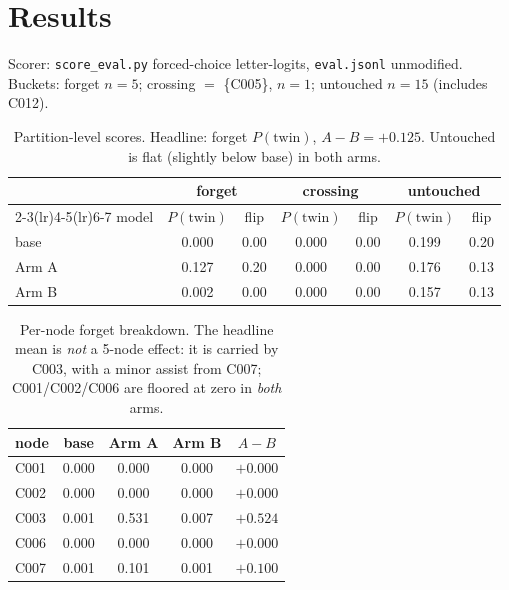 \documentclass[11pt]{article}
\newcommand{\Ptwin}{P(\text{twin})}
\begin{document}
\section{Results}\label{sec:results}
Scorer: \texttt{score\_eval.py} forced-choice letter-logits, \texttt{eval.jsonl}
unmodified. Buckets: forget $n{=}5$; crossing $=$ \{C005\}, $n{=}1$; untouched
$n{=}15$ (includes C012).
 
\begin{table}[h]
\centering
\begin{tabular}{lcccccc}
\toprule
 & \multicolumn{2}{c}{forget} & \multicolumn{2}{c}{crossing} & \multicolumn{2}{c}{untouched} \\
\cmidrule(lr){2-3}\cmidrule(lr){4-5}\cmidrule(lr){6-7}
model & $\Ptwin$ & flip & $\Ptwin$ & flip & $\Ptwin$ & flip \\
\midrule
base   & 0.000 & 0.00 & 0.000 & 0.00 & 0.199 & 0.20 \\
Arm A  & 0.127 & 0.20 & 0.000 & 0.00 & 0.176 & 0.13 \\
Arm B  & 0.002 & 0.00 & 0.000 & 0.00 & 0.157 & 0.13 \\
\bottomrule
\end{tabular}
\caption{Partition-level scores. Headline: forget $\Ptwin$, $A-B = +0.125$.
Untouched is flat (slightly below base) in both arms.}
\end{table}
 
\begin{table}[h]
\centering
\begin{tabular}{lcccc}
\toprule
node & base & Arm A & Arm B & $A-B$ \\
\midrule
C001 & 0.000 & 0.000 & 0.000 & $+0.000$ \\
C002 & 0.000 & 0.000 & 0.000 & $+0.000$ \\
C003 & 0.001 & 0.531 & 0.007 & $+0.524$ \\
C006 & 0.000 & 0.000 & 0.000 & $+0.000$ \\
C007 & 0.001 & 0.101 & 0.001 & $+0.100$ \\
\bottomrule
\end{tabular}
\caption{Per-node forget breakdown. The headline mean is \emph{not} a 5-node
effect: it is carried by C003, with a minor assist from C007; C001/C002/C006 are
floored at zero in \emph{both} arms.}
\end{table}
 
\end{document}
